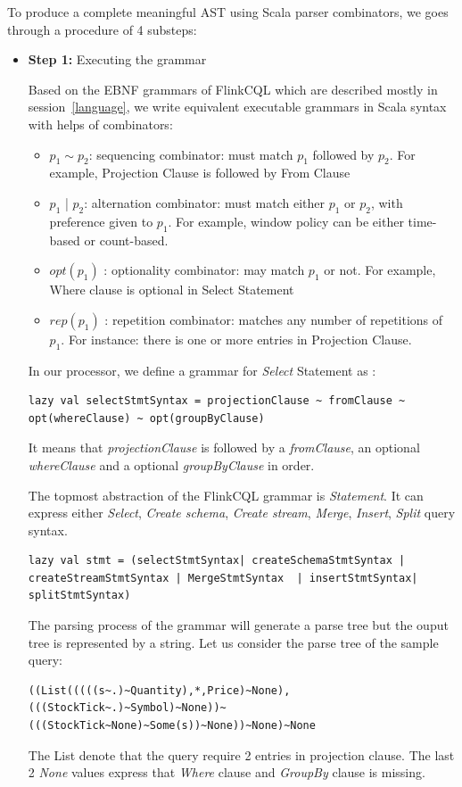 To produce a complete meaningful AST using Scala parser combinators, we goes through a procedure of 4 substeps:
\begin{itemize}

\item \textbf{Step 1:} Executing the grammar

Based on the EBNF grammars of FlinkCQL which are described mostly in session~\ref{language}, we write equivalent executable grammars in Scala syntax with helps of combinators:
\begin{itemize}
	\item $p_1 \sim p_2$: sequencing combinator: must match $p_1$ followed by $p_2$. For example, Projection Clause is followed by From Clause
	\item $p_1$ | $p_2$: alternation combinator: must match either $p_1$ or $p_2$, with preference given to $p_1$. For example, window policy can be either time-based or count-based.
	\item $opt(p_1)$ : optionality combinator: may match $p_1$ or not. For example, Where clause is optional in Select Statement
	\item $rep(p_1)$ : repetition combinator: matches any number of repetitions of $p_1$. For instance: there is one or more entries in Projection Clause.
\end{itemize} 

In our processor, we define a grammar for \textit{Select} Statement as :
\begin{lstlisting}
lazy val selectStmtSyntax = projectionClause ~ fromClause ~ opt(whereClause) ~ opt(groupByClause)
\end{lstlisting}
It means that \textit{projectionClause} is followed by a \textit{fromClause}, an optional \textit{whereClause} and a optional \textit{groupByClause} in order.

The topmost abstraction of the FlinkCQL grammar is \textit{Statement}. It can express either \textit{Select}, \textit{Create schema}, \textit{Create stream}, \textit{Merge}, \textit{Insert}, \textit{Split} query syntax.
\begin{lstlisting}
lazy val stmt = (selectStmtSyntax| createSchemaStmtSyntax | createStreamStmtSyntax | MergeStmtSyntax  | insertStmtSyntax| splitStmtSyntax)
\end{lstlisting}

The parsing process of the grammar will generate a parse tree but the ouput tree is represented by a string. Let us consider the parse tree of the sample query:
\begin{lstlisting}
((List(((((s~.)~Quantity),*,Price)~None),(((StockTick~.)~Symbol)~None))~(((StockTick~None)~Some(s))~None))~None)~None
\end{lstlisting}
The List denote that the query require 2 entries in projection clause. The last 2 \textit{None} values express that \textit{Where} clause and \textit{GroupBy} clause is missing.


\end{itemize}
